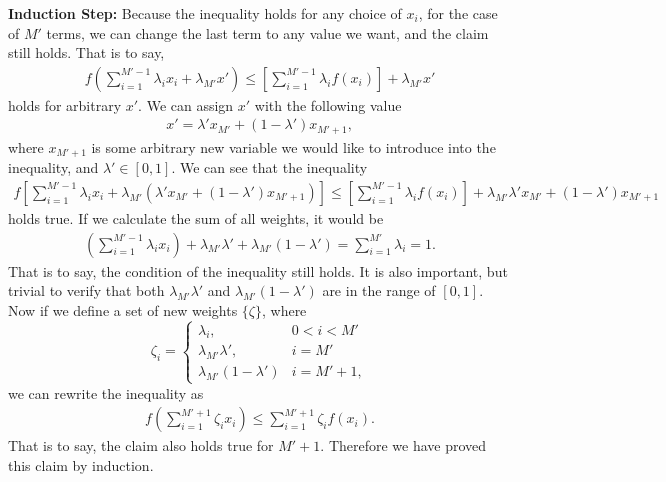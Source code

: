 \begin{answer}{}
	\noindent\textbf{Induction Step:}
	Because the inequality holds for any choice of $x_i$, for the case of $M'$ terms, we can change the last term to any value we want, and the claim still holds. That is to say,
	\begin{align}
		f\left( \sum_{i = 1}^{M' - 1} \lambda_i x_i  + \lambda_{M'}x'\right) \leq \left[\sum_{i = 1}^{M' - 1} \lambda_i f(x_i)\right] + \lambda_{M'}x'
	\end{align}
	holds for arbitrary $x'$. We can assign $x'$ with the following value
	\begin{align}
		x' = \lambda' x_{M'} + (1- \lambda') x_{M' + 1},
	\end{align}
	where $x_{M' + 1}$ is some arbitrary new variable we would like to introduce into the inequality, and $\lambda' \in [0, 1]$. We can see that the inequality
	\begin{align}
		f\left[ \sum_{i = 1}^{M' - 1} \lambda_i x_i  + \lambda_{M'}(\lambda' x_{M'} + (1- \lambda') x_{M' + 1}) \right] \leq \left[\sum_{i = 1}^{M' - 1} \lambda_i f(x_i)\right] + \lambda_{M'}\lambda' x_{M'} + (1- \lambda') x_{M' + 1}
	\end{align}
	holds true. If we calculate the sum of all weights, it would be
	\begin{align}
		\left(\sum_{i = 1}^{M' - 1} \lambda_i x_i\right) + \lambda_{M'}\lambda' + \lambda_{M'}(1- \lambda') = \sum_{i = 1}^{M'} \lambda_i = 1.
	\end{align}
	That is to say, the condition of the inequality still holds. It is also important, but trivial to verify that both $\lambda_{M'}\lambda'$ and $\lambda_{M'}(1- \lambda')$ are in the range of $[0, 1]$. Now if we define a set of new weights $\{ \zeta \}$, where
	\begin{equation}
		\zeta_i = 
		\begin{cases}
			\lambda_i, & 0 < i < M'\\
			\lambda_{M'}\lambda', & i = M'\\
			\lambda_{M'}(1- \lambda') & i = M' + 1,
		\end{cases}
	\end{equation}
	we can rewrite the inequality as
	\begin{align}
		f\left( \sum_{i = 1}^{M' + 1} \zeta_i x_i \right) \leq \sum_{i = 1}^{M' + 1} \zeta_i f(x_i).
	\end{align}
	That is to say, the claim also holds true for $M' + 1$. Therefore we have proved this claim by induction.
\end{answer}